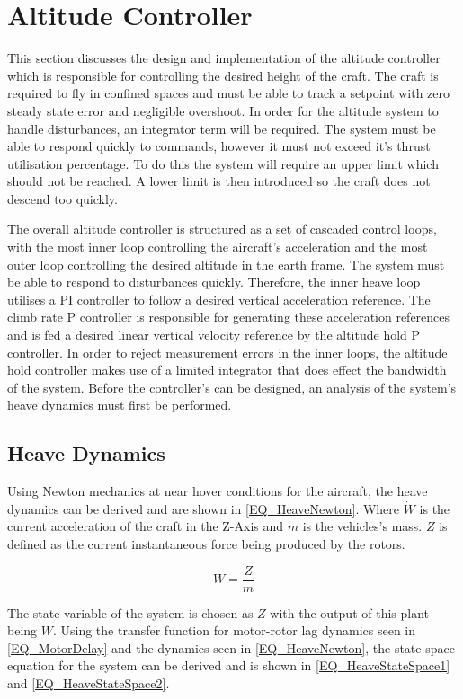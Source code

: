 \documentclass[12pt]{report}
\begin{document}
\section{Altitude Controller}
This section discusses the design and implementation of the altitude controller which is responsible for controlling the desired height of the craft. The craft is required to fly in confined spaces and must be able to track a setpoint with zero steady state error and negligible overshoot. In order for the altitude system to handle disturbances, an integrator term will be required. The system must be able to respond quickly to commands, however it must not exceed it's thrust utilisation percentage. To do this the system will require an upper limit which should not be reached. A lower limit is then introduced so the craft does not descend too quickly.

The overall altitude controller is structured as a set of cascaded control loops, with the most inner loop controlling the aircraft's acceleration and the most outer loop controlling the desired altitude in the earth frame. The system must be able to respond to disturbances quickly. Therefore, the inner heave loop utilises a PI controller to follow a desired vertical acceleration reference. The climb rate P controller is responsible for generating these acceleration references and is fed a desired linear vertical velocity reference by the altitude hold P controller. In order to reject measurement errors in the inner loops, the altitude hold controller makes use of a limited integrator that does effect the bandwidth of the system. Before the controller's can be designed, an analysis of the system's heave dynamics must first be performed.

\subsection{Heave Dynamics}
Using Newton mechanics at near hover conditions for the aircraft, the heave dynamics can be derived and are shown in \eqref{EQ_HeaveNewton}. Where $\dot{W}$ is the current acceleration of the craft in the Z-Axis and $m$ is the vehicles's mass. $Z$ is defined as the current instantaneous force being produced by the rotors.

\begin{equation}
\label{EQ_HeaveNewton}
\dot{W} = \dfrac{Z}{m}
\end{equation}

The state variable of the system is chosen as $Z$ with the output of this plant being $\dot{W}$. Using the transfer function for motor-rotor lag dynamics seen in \eqref{EQ_MotorDelay} and the dynamics seen in \eqref{EQ_HeaveNewton}, the state space equation for the system can be derived and is shown in \eqref{EQ_HeaveStateSpace1} and \eqref{EQ_HeaveStateSpace2}. 
\end{document}

